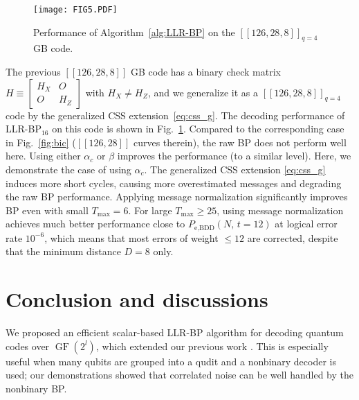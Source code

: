 \documentclass{ieeeaccess}
\DeclareMathOperator{\GF}{GF}
\theoremstyle{definition}		%
\begin{document}
\begin{figure} 
	\centering \texttt{[image: FIG5.PDF]}
	\caption{
	Performance of Algorithm~\ref{alg:LLR-BP} on the $[[126,28,8]]_{q=4}$ GB code.
	}\label{fig:126_q4}
\end{figure}


The previous $[[126,28,8]]$ GB code has a binary check matrix 
	${ H \equiv \left[\begin{smallmatrix} H_X&O\\ O&H_Z \end{smallmatrix}\right] }$     with ${H_X\ne H_Z}$, 
and we generalize it as a $[[126,28,8]]_{q=4}$ code by the generalized CSS extension~\eqref{eq:css_g}.
%
The decoding performance of \mbox{LLR-BP$_{16}$}  on this code is shown in Fig.~\ref{fig:126_q4}.
Compared to the corresponding case in Fig.~\ref{fig:bic} ($[[126,28]]$ curves therein), the raw BP does not perform well here. 
%
Using either $\alpha_c$ or $\beta$ improves the performance (to a similar level).
Here, we demonstrate the case of using $\alpha_c$.
%
The generalized CSS extension \eqref{eq:css_g} induces more short cycles, causing more overestimated messages and degrading the raw BP performance. 
Applying message normalization significantly improves BP even with small $T_{\max} = 6$.
%
For large $T_{\max}\ge 25$, using message normalization achieves much better performance close to \mbox{$P_\text{e,BDD}(N,\,t=12)$} at logical error rate $10^{-6}$, %
which means that most errors of weight $\le 12$ are corrected, despite that the minimum distance $D=8$ only.




 
\section{Conclusion and discussions} \label{sec:con}


We proposed an efficient scalar-based LLR-BP algorithm for decoding quantum codes over $\GF(2^l)$,
which extended our previous work \cite{KL20}.
This is especially useful when many qubits are grouped into a qudit and a nonbinary decoder is used;
our demonstrations   showed that correlated noise can be well handled by the nonbinary BP. 
\end{document}
